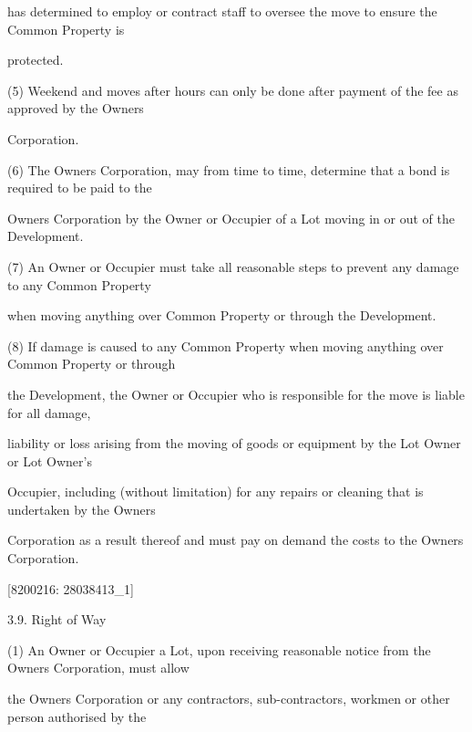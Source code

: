 \documentclass{article}
\begin{document}
{\fontsize{10.02}{1}has determined to employ or contract staff to oversee the move to ensure the Common Property is }

{\fontsize{10.02}{1}protected. }

{\fontsize{9.962}{1}(5) Weekend and moves after hours can only be done after payment of the fee as approved by the Owners }

{\fontsize{10.02}{1}Corporation. }

{\fontsize{9.962}{1}(6) The Owners Corporation, may from time to time, determine that a bond is required to be paid to the }

{\fontsize{10.02}{1}Owners Corporation by the Owner or Occupier of a Lot moving in or out of the Development. }

{\fontsize{9.962}{1}(7) An Owner or Occupier must take all reasonable steps to prevent any damage to any Common Property }

{\fontsize{10.02}{1}when moving anything over Common Property or through the Development. }

{\fontsize{9.962}{1}(8) If damage is caused to any Common Property when moving anything over Common Property or through }

{\fontsize{10.02}{1}the Development, the Owner or Occupier who is responsible for the move is liable for all damage, }

{\fontsize{10.02}{1}liability or loss arising from the moving of goods or equipment by the Lot Owner or Lot Owner’s }

{\fontsize{10.02}{1}Occupier, including (without limitation) for any repairs or cleaning that is undertaken by the Owners }

{\fontsize{10.02}{1}Corporation as a result thereof and must pay on demand the costs to the Owners Corporation. }

\newpage
















{\fontsize{7.02}{1}[8200216: 28038413\_1] }


{\fontsize{9.99}{1}3.9. Right of Way }

{\fontsize{9.962}{1}(1) An Owner or Occupier a Lot, upon receiving reasonable notice from the Owners Corporation, must allow }

{\fontsize{10.02}{1}the Owners Corporation or any contractors, sub-contractors, workmen or other person authorised by the }
\end{document}

